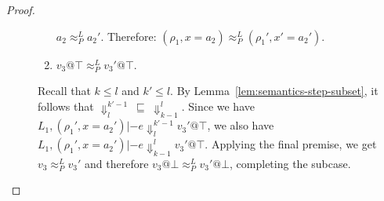 \documentclass{article}
\makeatletter
\theoremstyle{definition}
\newcommand{\at}{\ensuremath{{\scriptstyle{@}}}}
\makeatother
\begin{document}
\begin{proof}
\begin{description}
\begin{enumerate}
      $a_2 \approx^{L}_{P} a_2'$.
      Therefore:
      $(\rho_1, x = a_2) \approx^{L}_{P} (\rho_1', x' = a_2')$.
    \item
      $v_3 \at \top \approx^{L}_{P} v_3' \at \top$.
    \end{enumerate}
    Recall that $k \leq l$ and $k' \leq l$.
    By Lemma~\ref{lem:semantics-step-subset}, it follows that
    $\Downarrow^{k'-1}_{l}\ \sqsubseteq\ \Downarrow^{l}_{k-1}$.
    Since we have
    $L_1, (\rho_1', x = a_2') |- e \Downarrow^{k'-1}_{l} v_3' \at \top$,
    we also have
    $L_1, (\rho_1', x = a_2') |- e \Downarrow^{l}_{k-1} v_3' \at \top$.
    Applying the final premise, we get $v_3 \approx^{L}_{P} v_3'$ and
    therefore $v_3 \at \bot \approx^{L}_{P} v_3' \at \bot$,
    completing the subcase.
    \qedhere
  \end{description}
\end{proof}
\end{document}
